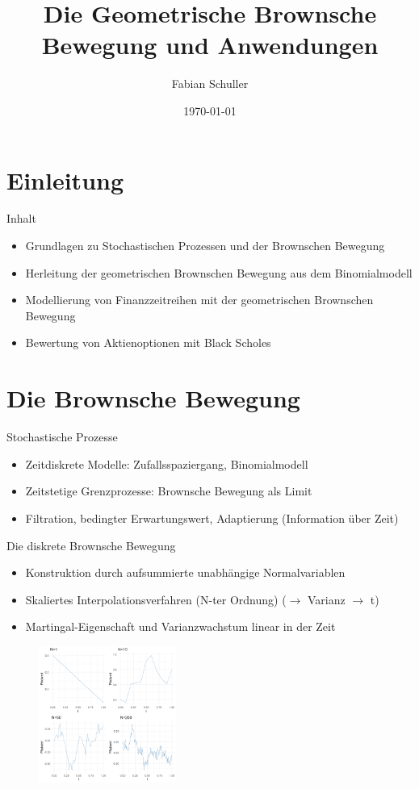 \documentclass{beamer}
\title[Die Geometrische Brownsche Bewegung und Anwendungen]{Die Geometrische Brownsche Bewegung und Anwendungen}
\author{Fabian Schuller}
\date{\today}
\begin{document}
\section{Einleitung}

\begin{frame}
  \titlepage
\end{frame}

\begin{frame}{Inhalt}
  \begin{itemize}
    \item Grundlagen zu Stochastischen Prozessen und der Brownschen Bewegung
    \item Herleitung der geometrischen Brownschen Bewegung aus dem Binomialmodell
    \item Modellierung von Finanzzeitreihen mit der geometrischen Brownschen Bewegung
    \item Bewertung von Aktienoptionen mit Black Scholes
  \end{itemize}
\end{frame}

\section{Die Brownsche Bewegung}

\begin{frame}{Stochastische Prozesse}
    \begin{itemize}
      \item Zeitdiskrete Modelle: Zufallsspaziergang, Binomialmodell
      \item Zeitstetige Grenzprozesse: Brownsche Bewegung als Limit
      \item Filtration, bedingter Erwartungswert, Adaptierung (Information über Zeit)
    \end{itemize}
\end{frame}

\begin{frame}{Die diskrete Brownsche Bewegung}
  \begin{itemize}
    \item Konstruktion durch aufsummierte unabhängige Normalvariablen
    \item Skaliertes Interpolationsverfahren (N-ter Ordnung) ($\rightarrow$ Varianz $\to$ t)
    \item Martingal-Eigenschaft und Varianzwachstum linear in der Zeit
  \end{itemize}
  \begin{figure}
    \centering
  \includegraphics[width=0.4\textwidth]{../thesis/images/disrete_bb.png}
  \end{figure}
\end{frame}
\end{document}
